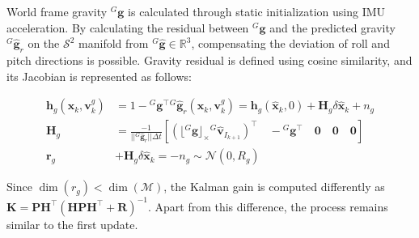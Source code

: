 World frame gravity ${}^G\textbf{g}$ is calculated through static initialization using \ac{IMU} acceleration. By calculating the residual between ${}^G\textbf{g}$ and the predicted gravity ${}^G\widehat{\textbf{g}}_r$ on the $\mathcal{S}^2$ manifold from ${}^G\widehat{\textbf{g}} \in \mathbb{R}^3$, compensating the deviation of roll and pitch directions is possible. Gravity residual is defined using cosine similarity, and its Jacobian is represented as follows:

\vspace{-4mm}\small
\begin{align}
  \label{eq:gravity measurement model}
    \textbf{h}_g(\textbf{x}_k,\textbf{v}_k^g)&=1-{}^G\textbf{g}^\top{}^G\widehat{\textbf{g}}_r(\textbf{x}_k,\textbf{v}_k^g) 
    =\textbf{h}_g(\widehat{\textbf{x}}_k,0)+\textbf{H}_{g}\delta\widehat{\textbf{x}}_k+n_{g} \nonumber \\
    \textbf{H}_{g}&=%
    \frac{-1}{||{}^G\widehat{\textbf{g}}_r||\Delta t}\left[ (\lfloor{}^G\textbf{g}\rfloor_\times{}^G\widehat{\textbf{v}}_{I_{k+1}})^\top\quad -{}^G\textbf{g}^\top\quad\textbf{0}\quad\textbf{0}\quad\textbf{0}\right] \nonumber\\
    \textbf{r}_{g}&+\textbf{H}_{g}\delta\widehat{\textbf{x}}_k=-n_{g}\sim\mathcal{N}(0,R_g)
\end{align}
\normalsize

Since $\dim(r_g) < \dim(\mathcal{M})$, the Kalman gain is computed differently as $\textbf{K}=\mathbf{P}\textbf{H}^\top(\textbf{H}\mathbf{P}\textbf{H}^\top+\textbf{R})^{-1}$. Apart from this difference, the process remains similar to the first update.
